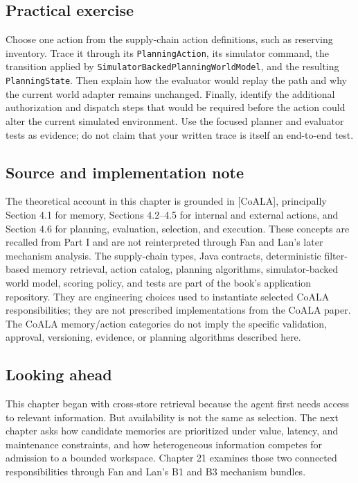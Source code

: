 \subsection*{Practical exercise}

Choose one action from the supply-chain action definitions, such as reserving inventory. Trace it through its \texttt{PlanningAction}, its simulator command, the transition applied by \texttt{SimulatorBacked\allowbreak{}PlanningWorldModel}, and the resulting \texttt{PlanningState}. Then explain how the evaluator would replay the path and why the current world adapter remains unchanged. Finally, identify the additional authorization and dispatch steps that would be required before the action could alter the current simulated environment. Use the focused planner and evaluator tests as evidence; do not claim that your written trace is itself an end-to-end test.

\subsection*{Source and implementation note}

The theoretical account in this chapter is grounded in [CoALA], principally Section 4.1 for memory, Sections 4.2--4.5 for internal and external actions, and Section 4.6 for planning, evaluation, selection, and execution. These concepts are recalled from Part I and are not reinterpreted through Fan and Lan's later mechanism analysis. The supply-chain types, Java contracts, deterministic filter-based memory retrieval, action catalog, planning algorithms, simulator-backed world model, scoring policy, and tests are part of the book's application repository. They are engineering choices used to instantiate selected CoALA responsibilities; they are not prescribed implementations from the CoALA paper. The CoALA memory/action categories do not imply the specific validation, approval, versioning, evidence, or planning algorithms described here.

\subsection*{Looking ahead}

This chapter began with cross-store retrieval because the agent first needs access to relevant information. But availability is not the same as selection. The next chapter asks how candidate memories are prioritized under value, latency, and maintenance constraints, and how heterogeneous information competes for admission to a bounded workspace. Chapter 21 examines those two connected responsibilities through Fan and Lan's B1 and B3 mechanism bundles.

